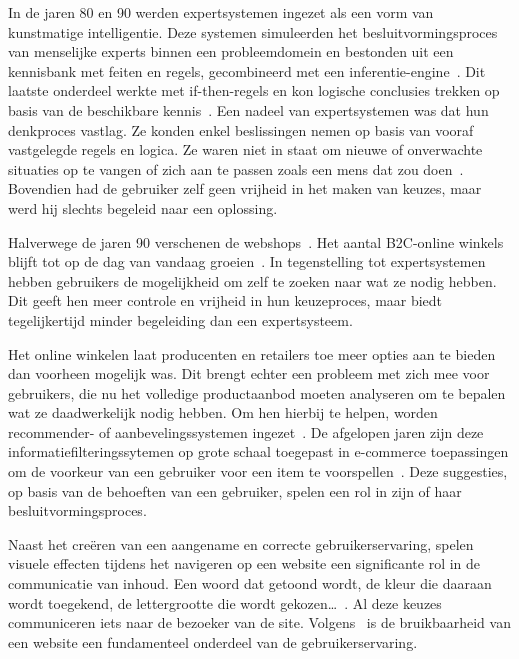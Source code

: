 In de jaren 80 en 90 werden expertsystemen ingezet als een vorm van kunstmatige intelligentie. Deze systemen simuleerden het besluitvormingsproces van menselijke experts binnen een probleemdomein en bestonden uit een kennisbank met feiten en regels, gecombineerd met een inferentie-engine~\autocite{Angeli2010,Castillo2012}. Dit laatste onderdeel werkte met if-then-regels en kon logische conclusies trekken op basis van de beschikbare kennis~\autocite{Buchanan1988}. Een nadeel van expertsystemen was dat hun denkproces vastlag. Ze konden enkel beslissingen nemen op basis van vooraf vastgelegde regels en logica. Ze waren niet in staat om nieuwe of onverwachte situaties op te vangen of zich aan te passen zoals een mens dat zou doen~\autocite{Castillo2012}. Bovendien had de gebruiker zelf geen vrijheid in het maken van keuzes, maar werd hij slechts begeleid naar een oplossing.\par
\medskip
Halverwege de jaren 90 verschenen de webshops~\autocite{Chu2007}. Het aantal B2C-online winkels blijft tot op de dag van vandaag groeien~\autocite{Pokki2016}. In tegenstelling tot expertsystemen hebben gebruikers de mogelijkheid om zelf te zoeken naar wat ze nodig hebben. Dit geeft hen meer controle en vrijheid in hun keuzeproces, maar biedt tegelijkertijd minder begeleiding dan een expertsysteem.\par
\medskip
Het online winkelen laat producenten en retailers toe meer opties aan te bieden dan voorheen mogelijk was. Dit brengt echter een probleem met zich mee voor gebruikers, die nu het volledige productaanbod moeten analyseren om te bepalen wat ze daadwerkelijk nodig hebben. Om hen hierbij te helpen, worden recommender- of aanbevelingssystemen ingezet~\autocite{Sivapalan2014}. De afgelopen jaren zijn deze informatiefilteringssytemen op grote schaal toegepast in e-commerce toepassingen om de voorkeur van een gebruiker voor een item te voorspellen~\autocite{Thorat2015}. Deze suggesties, op basis van de behoeften van een gebruiker, spelen een rol in zijn of haar besluitvormingsproces.\par

Naast het creëren van een aangename en correcte gebruikerservaring, spelen visuele effecten tijdens het navigeren op een website een significante rol in de communicatie van inhoud. Een woord dat getoond wordt, de kleur die daaraan wordt toegekend, de lettergrootte die wordt gekozen…~\autocite{bordbar2016}. Al deze keuzes communiceren iets naar de bezoeker van de site. Volgens~\textcite{Lee2012} is de bruikbaarheid van een website een fundamenteel onderdeel van de gebruikerservaring.

